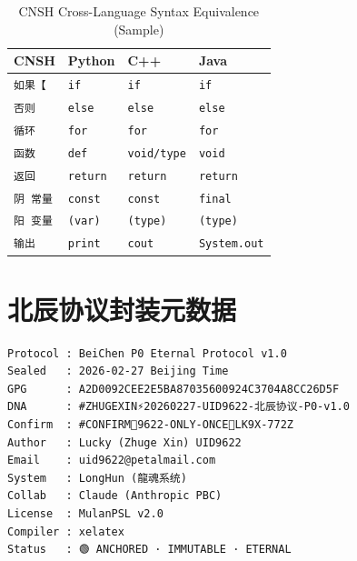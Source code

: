 \documentclass[conference]{IEEEtran}
\begin{document}
\begin{table}[h]
\centering
\caption{CNSH Cross-Language Syntax Equivalence (Sample)}
\renewcommand{\arraystretch}{1.3}
\begin{tabular}{llll}
\toprule
\textbf{CNSH} & \textbf{Python} & \textbf{C++} & \textbf{Java} \\
\midrule
\texttt{如果【}   & \texttt{if}   & \texttt{if}   & \texttt{if} \\
\texttt{否则}     & \texttt{else} & \texttt{else} & \texttt{else} \\
\texttt{循环}     & \texttt{for}  & \texttt{for}  & \texttt{for} \\
\texttt{函数}     & \texttt{def}  & \texttt{void/type} & \texttt{void} \\
\texttt{返回}     & \texttt{return} & \texttt{return} & \texttt{return} \\
\texttt{阴 常量} & \texttt{const}  & \texttt{const}  & \texttt{final} \\
\texttt{阳 变量} & \texttt{(var)}  & \texttt{(type)} & \texttt{(type)} \\
\texttt{输出}     & \texttt{print}  & \texttt{cout}   & \texttt{System.out} \\
\bottomrule
\end{tabular}
\end{table}

\section{北辰协议封装元数据}

\begin{small}
\begin{verbatim}
Protocol : BeiChen P0 Eternal Protocol v1.0
Sealed   : 2026-02-27 Beijing Time
GPG      : A2D0092CEE2E5BA87035600924C3704A8CC26D5F
DNA      : #ZHUGEXIN⚡️20260227-UID9622-北辰协议-P0-v1.0
Confirm  : #CONFIRM🌌9622-ONLY-ONCE🧬LK9X-772Z
Author   : Lucky (Zhuge Xin) UID9622
Email    : uid9622@petalmail.com
System   : LongHun (龍魂系统)
Collab   : Claude (Anthropic PBC)
License  : MulanPSL v2.0
Compiler : xelatex
Status   : 🟢 ANCHORED · IMMUTABLE · ETERNAL
\end{verbatim}
\end{small}
\end{document}
